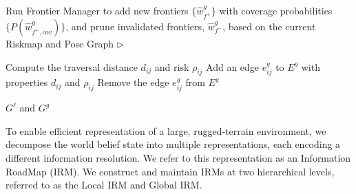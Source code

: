 \documentclass[letterpaper]{article} %
\newcommand{\ph}[1]{{\textbf{#1}:}} %
\begin{document}
\begin{algorithm}[t!]
{\begin{algorithmic}
  \STATE Run Frontier Manager to add new frontiers $\{\hat{w}^g_{f^+}\}$ with coverage probabilities $\{P(\hat{w}^g_{f^+,cov})\}$, and prune invalidated frontiers, $\hat{w}^g_{f^-}$, based on the current Riskmap and Pose Graph
  \STATE \hspace{4.5cm} $\triangleright$ \cite{keidar2012robot}

      \STATE Compute the traversal distance $d_{ij}$ and risk $\rho_{ij}$
        \STATE Add an edge $e^g_{ij}$ to $E^g$ with properties $d_{ij}$ and $\rho_{ij}$
      \ELSE
        \STATE Remove the edge $e^g_{ij}$ from $E^g$
      \ENDIF
    \ENDFOR
  \ENDFOR



  \vspace{3pt}
  \RETURN $G^\ell$ and $G^g$

\end{algorithmic}
} %
\end{algorithm}

\noindent
To enable efficient representation of a large, rugged-terrain environment, we decompose the world belief state into multiple representations, each encoding a different information resolution.
We refer to this representation as an Information RoadMap (IRM).
We construct and maintain IRMs at two hierarchical levels, referred to as the Local IRM and Global IRM. 

\end{document}
